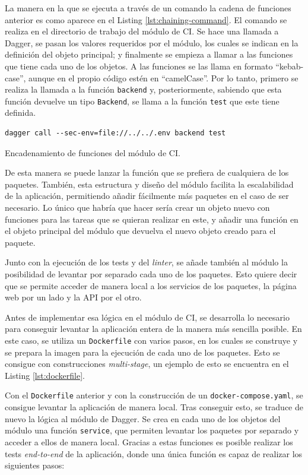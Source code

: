 La manera en la que se ejecuta a través de un comando la cadena de funciones anterior es como aparece en el Listing \ref{lst:chaining-command}. El comando se realiza en el directorio de trabajo del módulo de CI. Se hace una llamada a Dagger, se pasan los valores requeridos por el módulo, los cuales se indican en la definición del objeto principal; y finalmente se empieza a llamar a las funciones que tiene cada uno de los objetos. A las funciones se las llama en formato ``kebab-case'', aunque en el propio código estén en ``camelCase''. Por lo tanto, primero se realiza la llamada a la función \texttt{backend} y, posteriormente, sabiendo que esta función devuelve un tipo \texttt{Backend}, se llama a la función \texttt{test} que este tiene definida.

\begin{listing}[!ht]
  \begin{verbatim}
dagger call --sec-env=file://../../.env backend test
\end{verbatim}
\caption{Encadenamiento de funciones del módulo de CI.}
\label{lst:chaining-command}
\end{listing}

De esta manera se puede lanzar la función que se prefiera de cualquiera de los paquetes. También, esta estructura y diseño del módulo facilita la escalabilidad de la aplicación, permitiendo añadir fácilmente más paquetes en el caso de ser necesario. Lo único que habría que hacer sería crear un objeto nuevo con funciones para las tareas que se quieran realizar en este, y añadir una función en el objeto principal del módulo que devuelva el nuevo objeto creado para el paquete.

Junto con la ejecución de los tests y del \textit{linter}, se añade también al módulo la posibilidad de levantar por separado cada uno de los paquetes. Esto quiere decir que se permite acceder de manera local a los servicios de los paquetes, la página web por un lado y la API por el otro.

Antes de implementar esa lógica en el módulo de CI, se desarrolla lo necesario para conseguir levantar la aplicación entera de la manera más sencilla posible. En este caso, se utiliza un \texttt{Dockerfile} con varios pasos, en los cuales se construye y se prepara la imagen para la ejecución de cada uno de los paquetes. Esto se consigue con construcciones \textit{multi-stage}, un ejemplo de esto se encuentra en el Listing \ref{lst:dockerfile}.

Con el \texttt{Dockerfile} anterior y con la construcción de un \texttt{docker-compose.yaml}, se consigue levantar la aplicación de manera local. Tras conseguir esto, se traduce de nuevo la lógica al módulo de Dagger. Se crea en cada uno de los objetos del módulo una función \texttt{service}, que permiten levantar los paquetes por separado y acceder a ellos de manera local. Gracias a estas funciones es posible realizar los tests \textit{end-to-end} de la aplicación, donde una única función es capaz de realizar los siguientes pasos:

